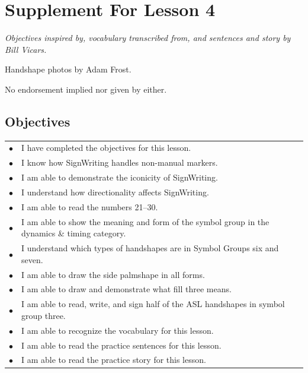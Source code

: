 \documentclass{article}
\begin{document}
\newfontfamily{}
\newfontfamily{}
\newcommand{\bul}{\hfil$\bullet$&}
\renewenvironment{glossary}{\begin{multicols}{5}\begin{center}}{\end{center}\end{multicols}}
\setcounter{secnumdepth}{0}
\setlength{\columnseprule}{1pt}

\section{Supplement For Lesson 4}

\begin{center}
\it
Objectives inspired by, vocabulary transcribed from, and sentences and story by Bill Vicars.

Handshape photos by Adam Frost.

No endorsement implied nor given by either.
\end{center}

\subsection{Objectives}

\begin{tabular}{p{1cm}p{14cm}}
\bul I have completed the objectives for this lesson.\\
\bul I know how SignWriting handles non-manual markers.\\
\bul I am able to demonstrate the iconicity of SignWriting.\\
\bul I understand how directionality affects SignWriting.\\
\bul I am able to read the numbers 21--30.\\
\bul I am able to show the meaning and form of the symbol group in the dynamics \& timing category.\\
\bul I understand which types of handshapes are in Symbol Groups six and seven.\\
\bul I am able to draw the side palmshape in all forms.\\
\bul I am able to draw and demonstrate what fill three means.\\
\bul I am able to read, write, and sign half of the ASL handshapes in symbol group three.\\
\bul I am able to recognize the vocabulary for this lesson.\\
\bul I am able to read the practice sentences for this lesson.\\
\bul I am able to read the practice story for this lesson.\\
\end{tabular}
\end{document}
